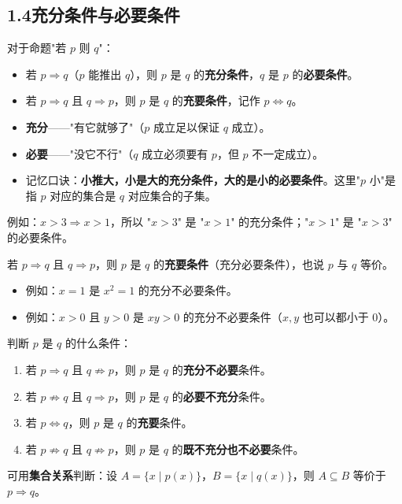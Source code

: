 \documentclass[12pt, a4paper]{ctexart}
\begin{document}
\subsection*{1.4\quad 充分条件与必要条件}

\begin{knowledgebox}[充分条件与必要条件]
对于命题"若 $p$ 则 $q$"：
\begin{itemize}[leftmargin=2em]
  \item 若 $p \Rightarrow q$（$p$ 能推出 $q$），则 $p$ 是 $q$ 的\textbf{充分条件}，$q$ 是 $p$ 的\textbf{必要条件}。
  \item 若 $p \Rightarrow q$ 且 $q \Rightarrow p$，则 $p$ 是 $q$ 的\textbf{充要条件}，记作 $p \Leftrightarrow q$。
\end{itemize}
\end{knowledgebox}

\begin{tipbox}[理解充分与必要]
\begin{itemize}[leftmargin=2em]
  \item \textbf{充分}——"有它就够了"（$p$ 成立足以保证 $q$ 成立）。
  \item \textbf{必要}——"没它不行"（$q$ 成立必须要有 $p$，但 $p$ 不一定成立）。
  \item 记忆口诀：\textbf{小推大，小是大的充分条件，大的是小的必要条件}。这里"$p$ 小"是指 $p$ 对应的集合是 $q$ 对应集合的子集。
\end{itemize}
例如：$x > 3 \Rightarrow x > 1$，所以 "$x > 3$" 是 "$x > 1$" 的充分条件；"$x > 1$" 是 "$x > 3$" 的必要条件。
\end{tipbox}

\begin{knowledgebox}[充要条件]
若 $p \Rightarrow q$ 且 $q \Rightarrow p$，则 $p$ 是 $q$ 的\textbf{充要条件}（充分必要条件），也说 $p$ 与 $q$ 等价。
\begin{itemize}[leftmargin=2em]
  \item 例如：$x = 1$ 是 $x^2 = 1$ 的充分不必要条件。
  \item 例如：$x > 0$ 且 $y > 0$ 是 $xy > 0$ 的充分不必要条件（$x, y$ 也可以都小于 $0$）。
\end{itemize}
\end{knowledgebox}

\begin{warnbox}[判断充要条件的方法]
判断 $p$ 是 $q$ 的什么条件：
\begin{enumerate}[leftmargin=2em]
  \item 若 $p \Rightarrow q$ 且 $q \not\Rightarrow p$，则 $p$ 是 $q$ 的\textbf{充分不必要}条件。
  \item 若 $p \not\Rightarrow q$ 且 $q \Rightarrow p$，则 $p$ 是 $q$ 的\textbf{必要不充分}条件。
  \item 若 $p \Leftrightarrow q$，则 $p$ 是 $q$ 的\textbf{充要}条件。
  \item 若 $p \not\Rightarrow q$ 且 $q \not\Rightarrow p$，则 $p$ 是 $q$ 的\textbf{既不充分也不必要}条件。
\end{enumerate}
可用\textbf{集合关系}判断：设 $A = \{x \mid p(x)\}$，$B = \{x \mid q(x)\}$，则 $A \subseteq B$ 等价于 $p \Rightarrow q$。
\end{warnbox}
\end{document}
